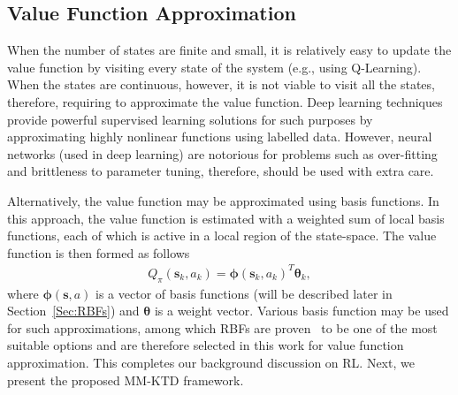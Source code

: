 \documentclass{ieeeaccess}
\def\MMK{\text{MM-KTD}}
\def\k{_{k}}
\def\bt{\bm{\theta}}
\def\s{\bm{s}}
\begin{document}
\subsection{Value Function Approximation}
When the number of states are finite and small, it is relatively easy to update the value function by visiting every state of the system (e.g., using Q-Learning). When the states are continuous, however, it is not viable to visit all the states, therefore, requiring to approximate the value function. Deep learning techniques provide powerful supervised learning solutions for such purposes by approximating highly nonlinear functions using labelled data. However, neural networks (used in deep learning) are notorious for problems such as over-fitting and brittleness to parameter tuning, therefore, should be used with extra care.

Alternatively, the value function may be approximated using basis functions. In this approach, the value function is estimated with a weighted sum of local basis functions, each of which is active in a local region of the state-space. The value function is then formed as follows
%
\begin{eqnarray}
Q_{\pi}(\s\k, a\k) = \bm{\phi}(\s\k, a\k)^T \bt\k, \label{Eq:7}
\end{eqnarray}
%
where $\bm{\phi}(\s, a)$ is a vector of basis functions (will be described later in Section~\ref{Sec:RBFs}) and $\bt$ is a weight vector. Various basis function may be used for such approximations, among which RBFs are proven~\cite{15} to be one of the most suitable options and are therefore selected in this work for value function approximation. This completes our background discussion on RL. Next, we present the proposed $\MMK$ framework.

\end{document}

